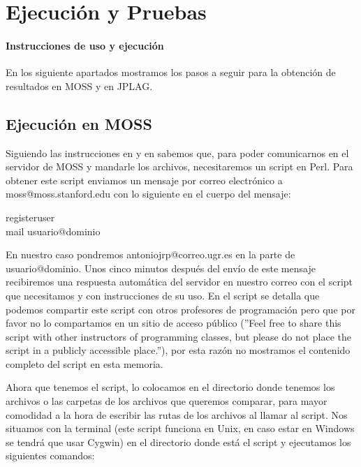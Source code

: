 \chapter{Ejecución y Pruebas}


\subsubsection{Instrucciones de uso y ejecución}

En los siguiente apartados mostramos los pasos a seguir para la obtención de resultados en MOSS y en JPLAG.

\section{Ejecución en MOSS}

Siguiendo las instrucciones en \cite{Moss_web} y en \cite{instrucciones_moss} sabemos que, para poder comunicarnos en el servidor de MOSS y mandarle los archivos, necesitaremos un script en Perl.
\newline
Para obtener este script enviamos un mensaje por correo electrónico a 
\newline 
moss@moss.stanford.edu con lo siguiente en el cuerpo del mensaje:

\begin{center}
registeruser
\\mail usuario@dominio
\end{center}

En nuestro caso pondremos antoniojrp@correo.ugr.es en la parte de usuario@dominio.
\newline
Unos cinco minutos después del envío de este mensaje recibiremos una respuesta automática del servidor en nuestro correo con el script que necesitamos y con instrucciones de su uso.
En el script se detalla que podemos compartir este script con otros profesores de programación pero que por favor no lo compartamos en un sitio de acceso público (''Feel free to share this script with other instructors of programming classes, but please do not place the script in a publicly accessible place.''), por esta razón no mostramos el contenido completo del script en esta memoria.

\bigskip
Ahora que tenemos el script, lo colocamos en el directorio donde tenemos los archivos o las carpetas de los archivos que queremos comparar, para mayor comodidad a la hora de escribir las rutas de los archivos al llamar al script.
\newline
Nos situamos con la terminal (este script funciona en Unix, en caso estar en Windows se tendrá que usar Cygwin) en el directorio donde está el script y ejecutamos los siguientes comandos:

